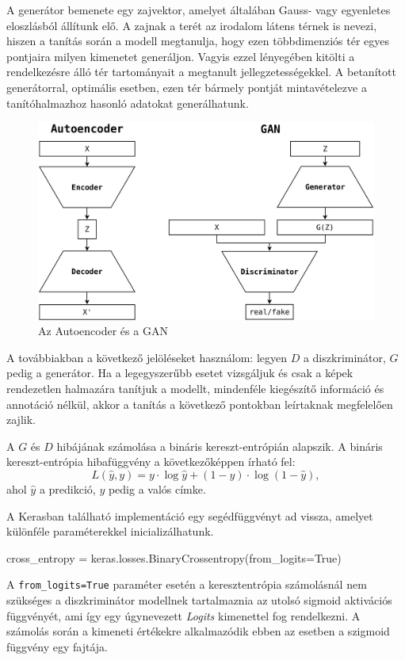 A generátor bemenete egy zajvektor, amelyet általában Gauss- vagy egyenletes eloszlásból állítunk elő. A zajnak a terét az irodalom látens térnek is nevezi, hiszen a tanítás során a modell megtanulja, hogy ezen többdimenziós tér egyes pontjaira milyen kimenetet generáljon. Vagyis ezzel lényegében kitölti a rendelkezésre álló tér tartományait a megtanult jellegzetességekkel. A betanított generátorral, optimális esetben, ezen tér bármely pontját mintavételezve a tanítóhalmazhoz hasonló adatokat generálhatunk.

\begin{figure}[h]
\centering
\includegraphics[width=12cm]{images/AEvsGAN.png}
\caption{Az Autoencoder és a GAN}
\label{fig:aevsgan}
\end{figure}


A továbbiakban a következő jelöléseket használom: legyen $D$ a diszkriminátor, $G$ pedig a generátor.
Ha a legegyszerűbb esetet vizsgáljuk és csak a képek rendezetlen halmazára tanítjuk a modellt, mindenféle kiegészítő információ és annotáció nélkül, akkor a tanítás a következő pontokban leírtaknak megfelelően zajlik.


A $G$ és $D$ hibájának számolása a bináris kereszt-entrópián alapszik.
A bináris kereszt-entrópia hibafüggvény a következőképpen írható fel:
$$L(\hat y, y) = y \cdot \log \hat y + (1-y) \cdot \log (1 - \hat y),$$
ahol $\hat y$ a predikció, $y$ pedig a valós címke.

A Kerasban található implementáció egy segédfüggvényt ad vissza, amelyet különféle paraméterekkel inicializálhatunk.
\begin{python}
cross_entropy = keras.losses.BinaryCrossentropy(from_logits=True)
\end{python}
A \texttt{from\_logits=True} paraméter esetén a keresztentrópia számolásnál nem szükséges a diszkriminátor modellnek tartalmaznia az utolsó sigmoid aktivációs függvényét, ami így egy úgynevezett \textit{Logits} kimenettel fog rendelkezni. A számolás során a kimeneti értékekre alkalmazódik ebben az esetben a szigmoid függvény egy fajtája.

